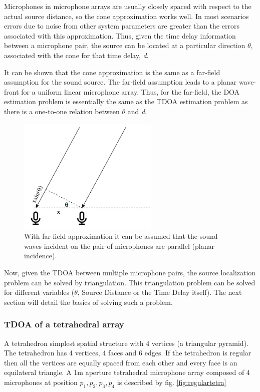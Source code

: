 Microphones in microphone arrays are usually closely spaced with respect to the actual source distance, so the cone approximation works well. In most scenarios errors due to noise from other system parameters are greater than the errors associated with this approximation. Thus, given the time delay information between a microphone pair, the source can be located at a particular direction $\theta$, associated with the cone for that time delay, \textit{d}. 

It can be shown that the cone approximation is the same as a far-field assumption for the sound source. The far-field assumption leads to a planar wave-front for a uniform linear microphone array. Thus, for the far-field, the DOA estimation problem is essentially the same as the TDOA estimation problem as there is a one-to-one relation between $\theta$ and \textit{d}.

\begin{figure}
    \centering
    \includegraphics[width=0.6\textwidth]{Figures/Far-field.png}
    \caption{With far-field approximation it can be assumed that the sound waves incident on the pair of microphones are parallel (planar incidence).}
    \label{fig:my_label}
\end{figure}

Now, given the TDOA between multiple microphone pairs, the source localization problem can be solved by triangulation. This triangulation problem can be solved for different variables ($\theta$, Source Distance or the Time Delay itself). The next section will detail the basics of solving such a problem. 

\subsubsection{TDOA of a tetrahedral array}\label{sec:TDOAN}

A tetrahedron simplest spatial structure with 4 vertices (a triangular pyramid). The tetrahedron has 4 vertices, 4 faces and 6 edges. If the tetrahedron is regular then all the vertices are equally spaced from each other and every face is an equilateral triangle. A 1m aperture tetrahedral microphone array composed of 4 microphones at position $p_1, p_2, p_3, p_4$ is described by fig. \ref{fig:regulartetra}

